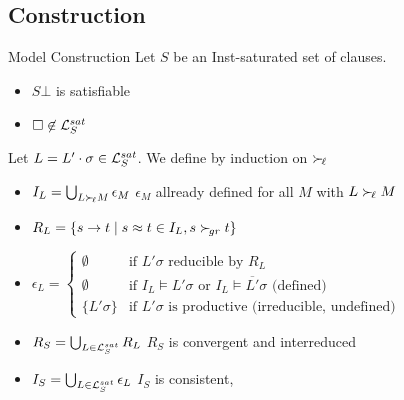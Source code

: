 \documentclass[%
handout,
]{beamer}
\begin{document}
\subsection{Construction}
\begin{frame}[allowframebreaks]{Model Construction}
    Let $S$ be an Inst-saturated set of clauses.
    \begin{itemize}
        \item $S\bot$ is satisfiable
        \item $\square\not\in\mathcal{L}_S^{sat}$

\end{itemize}

\vspace{1.4em}
    Let $L = L'\cdot\sigma \in\mathcal{L}_S^{sat}$.
    We define by induction on $\mathrel\succ_{\!\ell}$
        \begin{itemize}
            \item $I_L = \bigcup_{L\mathrel\succ_{\!\ell} M}\epsilon_M$
            \hfill $\epsilon_M$ allready defined for all $M$ with $L\mathrel\succ_{\!\ell} M$

            \item $R_L = \{ s \to t \mid s\approx t\in I_L, s\mathrel\succ_{\!gr} t \}$

                \item $\epsilon_L = \left\{
                    \begin{array}{cl}
                        \emptyset &\text{if }
                        L'\sigma\text{ reducible by }R_L
                        \\
                        \emptyset &\text{if }
                        I_L\vDash L'\sigma
                        \text{ or }
                        I_L\vDash \overline{L'}\sigma
                        \text{ (defined)}
                        \\
                        \{ L'\sigma \}
                        &\text{if }L'\sigma \text{ is productive (irreducible, undefined)}
                    \end{array}
                \right.$

                \framebreak
            \item
            $R_S = \bigcup_{L\in\mathcal{L}_S^{sat}} R_L$
            \hfill
            $R_S$ is convergent and interreduced

            \vspace{0.7em}
            \item
            $I_S = \bigcup_{L\in\mathcal{L}_S^{sat}} \epsilon_L$
            \hfill
            $I_S$ is consistent,


\end{itemize}
\end{frame}
\end{document}

